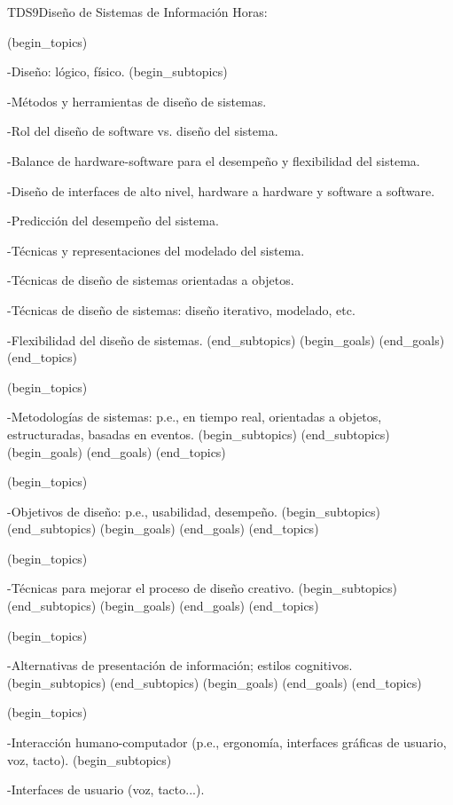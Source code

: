 \begin{BKL2}{TDS9}{Diseño de Sistemas de Información}
Horas:
 
(begin_topics)

-Diseño: lógico, físico.
(begin_subtopics)

-Métodos y herramientas de diseño de sistemas.

-Rol del diseño de software vs. diseño del sistema.

-Balance de hardware-software para el desempeño y flexibilidad del sistema.

-Diseño de interfaces de alto nivel, hardware a hardware y software a software.

-Predicción del desempeño del sistema.

-Técnicas y representaciones del modelado del sistema.

-Técnicas de diseño de sistemas orientadas a objetos.

-Técnicas de diseño de sistemas: diseño iterativo, modelado, etc.

-Flexibilidad del diseño de sistemas.
(end_subtopics)
(begin_goals)
(end_goals)
(end_topics)

 

(begin_topics)

-Metodologías de sistemas: p.e., en tiempo real, orientadas a objetos, estructuradas, basadas en eventos.
(begin_subtopics)
(end_subtopics)
(begin_goals)
(end_goals)
(end_topics)

 

(begin_topics)

-Objetivos de diseño: p.e., usabilidad, desempeño.
(begin_subtopics)
(end_subtopics)
(begin_goals)
(end_goals)
(end_topics)

 

(begin_topics)

-Técnicas para mejorar el proceso de diseño creativo.
(begin_subtopics)
(end_subtopics)
(begin_goals)
(end_goals)
(end_topics)

 

(begin_topics)

-Alternativas de presentación de información; estilos cognitivos.
(begin_subtopics)
(end_subtopics)
(begin_goals)
(end_goals)
(end_topics)

 

(begin_topics)

-Interacción humano-computador (p.e., ergonomía, interfaces gráficas de usuario, voz, tacto).
(begin_subtopics)

-Interfaces de usuario (voz, tacto...).


\end{BKL2}
